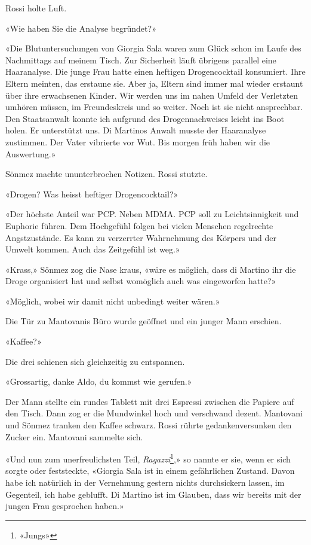 Rossi holte Luft.

«Wie haben Sie die Analyse begründet?»

«Die Blutuntersuchungen von Giorgia Sala waren zum Glück schon im Laufe
des Nachmittags auf meinem Tisch. Zur Sicherheit läuft übrigens parallel
eine Haaranalyse. Die junge Frau hatte einen heftigen Drogencocktail
konsumiert. Ihre Eltern meinten, das erstaune sie. Aber ja, Eltern sind
immer mal wieder erstaunt über ihre erwachsenen Kinder. Wir werden uns
im nahen Umfeld der Verletzten umhören müssen, im Freundeskreis und so
weiter. Noch ist sie nicht ansprechbar. Den Staatsanwalt konnte ich
aufgrund des Drogennachweises leicht ins Boot holen. Er unterstützt uns.
Di Martinos Anwalt musste der Haaranalyse zustimmen. Der Vater vibrierte
vor Wut. Bis morgen früh haben wir die Auswertung.»

Sönmez machte ununterbrochen Notizen. Rossi stutzte.

«Drogen? Was heisst heftiger Drogencocktail?»

«Der höchste Anteil war PCP. Neben MDMA. PCP soll zu Leichtsinnigkeit
und Euphorie führen. Dem Hochgefühl folgen bei vielen Menschen
regelrechte Angstzustände. Es kann zu verzerrter Wahrnehmung des
Körpers und der Umwelt kommen. Auch das Zeitgefühl ist weg.»

«Krass,» Sönmez zog die Nase kraus, «wäre es möglich, dass di Martino ihr die Droge organisiert hat und
selbst womöglich auch was eingeworfen hatte?»

«Möglich, wobei wir damit nicht unbedingt weiter wären.»

Die Tür zu Mantovanis Büro wurde geöffnet und ein junger Mann erschien.

«Kaffee?»

Die drei schienen sich gleichzeitig zu entspannen. 

«Grossartig, danke Aldo, du kommst wie gerufen.»

Der Mann stellte ein rundes Tablett mit drei Espressi zwischen die
Papiere auf den Tisch. Dann zog er die Mundwinkel hoch und verschwand
dezent. Mantovani und Sönmez tranken den Kaffee
schwarz. Rossi rührte gedankenversunken den Zucker ein.
Mantovani sammelte sich. 

«Und nun zum unerfreulichsten Teil, \emph{Ragazzi}\footnote{«Jungs»},» so nannte er sie, 
wenn er sich sorgte oder feststeckte, «Giorgia Sala ist in einem gefährlichen Zustand.
Davon habe ich natürlich in der Vernehmung gestern nichts durchsickern
lassen, im Gegenteil, ich habe geblufft. Di Martino ist im Glauben, dass
wir bereits mit der jungen Frau gesprochen haben.»

